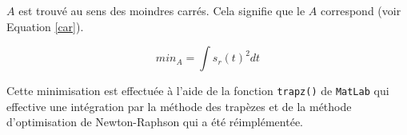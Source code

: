 \documentclass[10pt,a4paper]{article}
\begin{document}
			$A$ est trouvé au sens des moindres carrés. Cela signifie que le $A$ correspond (voir Equation \ref{car}). 
			
			\begin{equation}
				\label{car}
				min_A = \int s_r(t)^2 dt
			\end{equation} 
			
			Cette minimisation est effectuée à l'aide de la fonction \texttt{trapz()} de \texttt{MatLab} qui effective une intégration par la méthode des trapèzes et de la méthode d'optimisation de Newton-Raphson qui a été réimplémentée. 
\end{document}
